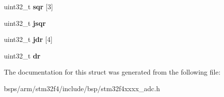 \begin{DoxyCompactItemize}
uint32\+\_\+t {\bfseries sqr} \mbox{[}3\mbox{]}
\item 
\mbox{\label{structstm32f4__adc__chan__s_a668b5302e4695065f3ce072334026139}} 
uint32\+\_\+t {\bfseries jsqr}
\item 
\mbox{\label{structstm32f4__adc__chan__s_a5b9e42b7d383349f20786428daa620a6}} 
uint32\+\_\+t {\bfseries jdr} \mbox{[}4\mbox{]}
\item 
\mbox{\label{structstm32f4__adc__chan__s_aa22390e507bbb3a2c4fed97f5bb47bc0}} 
uint32\+\_\+t {\bfseries dr}
\end{DoxyCompactItemize}


The documentation for this struct was generated from the following file\+:\begin{DoxyCompactItemize}
\item 
bsps/arm/stm32f4/include/bsp/stm32f4xxxx\+\_\+adc.\+h\end{DoxyCompactItemize}

